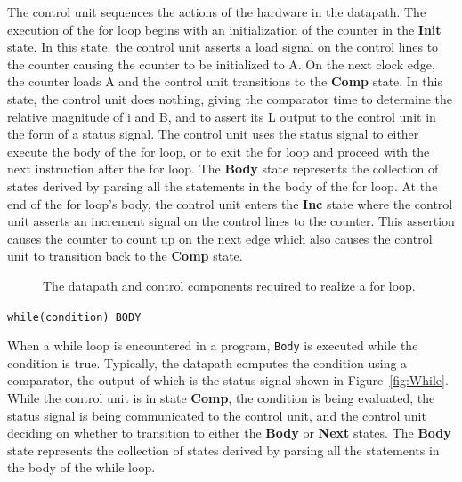 \begin{description}
The control unit sequences the actions of the hardware in the
datapath.  The execution of the for loop begins with an 
initialization of the counter in the {\bf Init} state.  In this state,
the control unit asserts a load signal on the control lines to
the counter causing the counter to be initialized to A.  On the
next clock edge, the counter loads A and the control unit
transitions to the {\bf Comp} state.  In this state, the control unit
does nothing, giving the comparator time to determine the 
relative magnitude of i and B, and to assert its L output
to the control unit in the form of a status signal. The control
unit uses the status signal to either execute the body of 
the for loop, or to exit the for loop and proceed with
the next instruction after the for loop.  The {\bf Body} state 
represents the collection of states derived by parsing all 
the statements in the body of the for loop.  At the end of the 
for loop's body, the control unit enters the {\bf Inc} state where the 
control unit asserts an increment signal on the control lines 
to the counter.  This assertion causes the counter to count up on the 
next edge which also causes the control unit to transition
back to the {\bf Comp} state.

\begin{figure}[ht]
\caption{The datapath and control components required to realize
a for loop.}
\label{fig:For}
\end{figure}

\item[]\verb+while(condition) BODY+


When a while loop is encountered in a program, \verb^Body^ is executed 
while the condition is true.  Typically, 
the datapath computes the condition using a comparator, the 
output of which is the status signal shown in 
Figure~\ref{fig:While}.  While the control unit is in state
{\bf Comp}, the condition is being evaluated, the status signal is
being communicated to the control unit, and the control unit 
deciding on whether to transition to either the {\bf Body} or 
{\bf Next} states.  The {\bf Body} state represents the 
collection of states derived by parsing all the statements 
in the body of the while loop.


\end{description}
